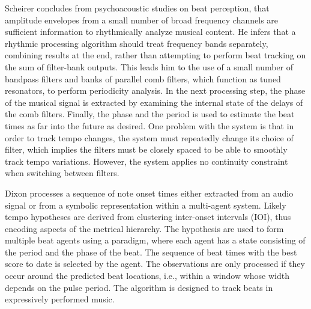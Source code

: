 \documentclass{scrartcl}
\begin{document}
Scheirer \cite{Scheirer1998} concludes from psychoacoustic studies on beat perception, that amplitude envelopes from a small number of broad frequency channels are sufficient information to rhythmically analyze musical content. He infers that a rhythmic processing algorithm should treat frequency bands separately, combining results at the end, rather than attempting to perform beat tracking on the sum of filter-bank outputs. This leads him to the use of a small number of bandpass filters and banks of parallel comb filters, which function as tuned resonators, to perform periodicity analysis. In the next processing step, the phase of the musical signal is extracted by examining the internal state of the delays of the comb filters. Finally, the phase and the period is used to estimate the beat times as far into the future as desired. One problem with the system is that in order to track tempo changes, the system must repeatedly change its choice of filter, which implies the filters must be closely spaced to be able to smoothly track tempo variations. However, the system applies no continuity constraint when switching between filters.  

Dixon \cite{Dixon2001} processes a sequence of note onset times either extracted from an audio signal or from a symbolic representation within a multi-agent system. Likely tempo hypotheses are derived from clustering inter-onset intervals (IOI), thus encoding aspects of the metrical hierarchy. The hypothesis are used to form multiple beat agents using a paradigm, where each agent has a state consisting of the period and the phase of the beat. The sequence of beat times with the best score to date is selected by the agent. The observations are only processed if they occur around the predicted beat locations, i.e., within a window whose width depends on the pulse period. The algorithm is designed to track beats in expressively performed music.

\end{document}
